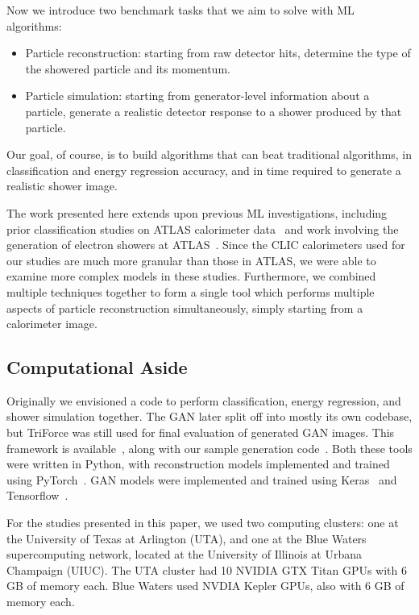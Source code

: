 Now we introduce two benchmark tasks that we aim to solve with ML algorithms: 
\begin{itemize}
    \item Particle reconstruction: starting from raw detector hits, determine the type of the showered particle and its momentum.
    \item Particle simulation: starting from generator-level information about a particle, generate a realistic detector response to a shower produced by that particle.
\end{itemize}

Our goal, of course, is to build algorithms that can beat traditional algorithms, in classification and energy regression accuracy, and in time required to generate a realistic shower image.

The work presented here extends upon previous ML investigations, including prior classification studies on ATLAS calorimeter data~\cite{Nachman_DNN} and work involving the generation of electron showers at ATLAS~\cite{Nachman_GAN,Nachman_GAN2}. Since the CLIC calorimeters used for our studies are much more granular than those in ATLAS, we were able to examine more complex models in these studies. Furthermore, we combined multiple techniques together to form a single tool which performs multiple aspects of particle reconstruction simultaneously, simply starting from a calorimeter image.

\subsection*{Computational Aside}

Originally we envisioned a code to perform classification, energy regression, and shower simulation together. The GAN later split off into mostly its own codebase, but TriForce was still used for final evaluation of generated GAN images. This framework is available~\cite{TriForce}, along with our sample generation code~\cite{CaloSampleGeneration}. Both these tools were written in Python, with reconstruction models implemented and trained using PyTorch~\cite{PyTorch}. GAN models were implemented and trained using Keras~\cite{keras} and  Tensorflow~\cite{tensorflow2015-whitepaper}.

For the studies presented in this paper, we used two computing clusters: one at the University of Texas at Arlington (UTA), and one at the Blue Waters supercomputing network, located at the University of Illinois at Urbana Champaign (UIUC). The UTA cluster had 10 NVIDIA GTX Titan GPUs with 6 GB of memory each. Blue Waters used NVDIA Kepler GPUs, also with 6 GB of memory each.